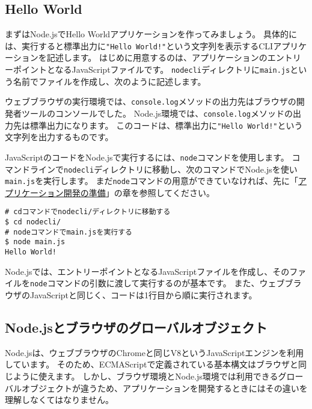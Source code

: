 \hypertarget{hello-world}{%
\subsection{Hello World}\label{hello-world}}

まずはNode.jsでHello Worldアプリケーションを作ってみましょう。
具体的には、実行すると標準出力に\texttt{"Hello World!"}という文字列を表示するCLIアプリケーションを記述します。
はじめに用意するのは、アプリケーションのエントリーポイントとなるJavaScriptファイルです。
\texttt{nodecli}ディレクトリに\texttt{main.js}という名前でファイルを作成し、次のように記述します。



ウェブブラウザの実行環境では、\texttt{console.log}メソッドの出力先はブラウザの開発者ツールのコンソールでした。
Node.js環境では、\texttt{console.log}メソッドの出力先は標準出力になります。
このコードは、標準出力に\texttt{"Hello World!"}という文字列を出力するものです。

JavaScriptのコードをNode.jsで実行するには、\texttt{node}コマンドを使用します。
コマンドラインで\texttt{nodecli}ディレクトリに移動し、次のコマンドでNode.jsを使い\texttt{main.js}を実行します。
まだ\texttt{node}コマンドの用意ができていなければ、先に「\hyperlink{setup-local-env}{アプリケーション開発の準備}」の章を参照してください。

\begin{lstlisting}
# cdコマンドでnodecli/ディレクトリに移動する
$ cd nodecli/
# nodeコマンドでmain.jsを実行する
$ node main.js
Hello World!
\end{lstlisting}

Node.jsでは、エントリーポイントとなるJavaScriptファイルを作成し、そのファイルを\texttt{node}コマンドの引数に渡して実行するのが基本です。
また、ウェブブラウザのJavaScriptと同じく、コードは1行目から順に実行されます。

\hypertarget{global-objects}{%
\subsection{Node.jsとブラウザのグローバルオブジェクト}\label{global-objects}}

Node.jsは、ウェブブラウザのChromeと同じV8というJavaScriptエンジンを利用しています。
そのため、ECMAScriptで定義されている基本構文はブラウザと同じように使えます。
しかし、ブラウザ環境とNode.js環境では利用できるグローバルオブジェクトが違うため、アプリケーションを開発するときにはその違いを理解しなくてはなりません。

